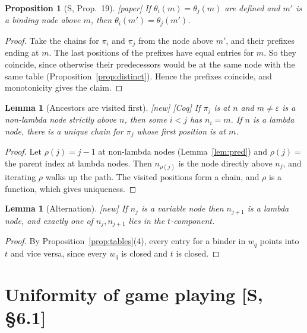 \documentclass[11pt]{article}
\newcommand{\Paper}{\textsf{[paper]}}
\newcommand{\New}{\textsf{[new]}}
\newcommand{\Coq}{\textsf{[Coq]}}
\theoremstyle{plain}
\newtheorem{proposition}[theorem]{Proposition}
\newtheorem{lemma}[theorem]{Lemma}
\theoremstyle{definition}
\theoremstyle{remark}
\begin{document}
\begin{proposition}[S, Prop.~19]\label{prop:agree}
\Paper{} If $\theta_i(m)=\theta_j(m)$ are defined and $m'$ is a binding
node above $m$, then $\theta_i(m')=\theta_j(m')$.
\end{proposition}
\begin{proof}
Take the chains for $\pi_i$ and $\pi_j$ from the node above $m'$, and
their prefixes ending at $m$.  The last positions of the prefixes have
equal entries for $m$.  So they coincide, since otherwise their
predecessors would be at the same node with the same table
(Proposition~\ref{prop:distinct}).  Hence the prefixes coincide, and
monotonicity gives the claim.
\end{proof}

\begin{lemma}[Ancestors are visited first]\label{lem:ancestors}
\New{} \Coq{} If $\pi_j$ is at $n$ and $m\ne\varepsilon$ is a
non-lambda node strictly above $n$, then some $i<j$ has $n_i=m$.  If $n$
is a lambda node, there is a unique chain for $\pi_j$ whose first
position is at $m$.
\end{lemma}
\begin{proof}
Let $\rho(j)=j-1$ at non-lambda nodes (Lemma~\ref{lem:pred}) and
$\rho(j)=$ the parent index at lambda nodes.  Then $n_{\rho(j)}$ is the
node directly above $n_j$, and iterating $\rho$ walks up the path.
The visited positions form a chain, and $\rho$ is a function, which
gives uniqueness.
\end{proof}

\begin{lemma}[Alternation]\label{lem:alt}
\New{} If $n_j$ is a variable node then $n_{j+1}$ is a lambda node, and
exactly one of $n_j,n_{j+1}$ lies in the $t$-component.
\end{lemma}
\begin{proof}
By Proposition~\ref{prop:tables}(4), every entry for a binder in $w_q$
points into $t$ and vice versa, since every $w_q$ is closed and $t$ is
closed.
\end{proof}

\section{Uniformity of game playing [S, \S6.1]}\label{sec:uniformity}
\end{document}
